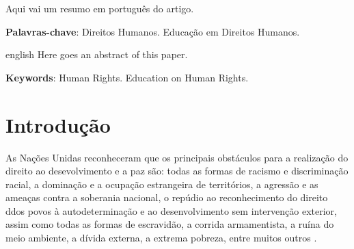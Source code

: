 \documentclass[
	article,			%
	11pt,				%
	oneside,			%
	a4paper,			%
	english,			%
	brazil,				%
	sumario=tradicional
]{abntex2}
\begin{document}

\frenchspacing


\maketitle

\begin{resumoumacoluna}
 Aqui vai um resumo em português do artigo.

 \vspace{\onelineskip}
 
 \noindent
 \textbf{Palavras-chave}: Direitos Humanos. Educação em Direitos Humanos.
\end{resumoumacoluna}


\renewcommand{\resumoname}{Abstract}
\begin{resumoumacoluna}
 \begin{otherlanguage*}{english}
   Here goes an abstract of this paper.

   \vspace{\onelineskip}
 
   \noindent
   \textbf{Keywords}: Human Rights. Education on Human Rights.
 \end{otherlanguage*}  
\end{resumoumacoluna}

\textual

\section{Introdução}

As Nações Unidas reconheceram que os principais obstáculos para a realização do
direito ao desevolvimento e a paz são: todas as formas de racismo e
discriminação racial, a dominação e a ocupação estrangeira de territórios, a
agressão e as ameaças contra a soberania nacional, o repúdio ao reconhecimento
do direito ddos povos à autodeterminação e ao desenvolvimento sem intervenção
exterior, assim como todas as formas de escravidão, a corrida armamentista,
a ruína do meio ambiente, a dívida externa, a extrema pobreza, entre muitos
outros \cite{RAYO2004}.
\end{document}
